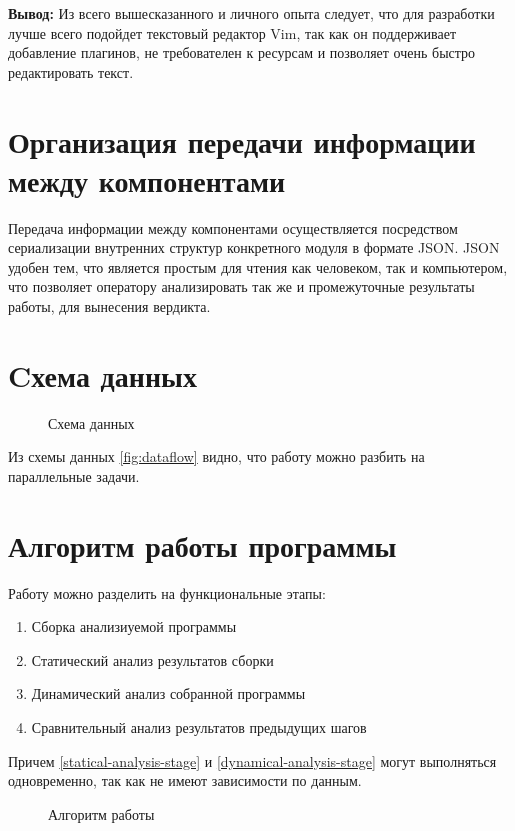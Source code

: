 \textbf{Вывод:} Из всего вышесказанного и личного опыта следует, 
что для разработки {\ProgModule} лучше всего подойдет текстовый редактор Vim,
так как он поддерживает добавление плагинов, не требователен к ресурсам и позволяет
очень быстро редактировать текст.

\newpage

\section{Организация передачи информации между компонентами {\ProgModule}}\label{sec:ch2/sec3}
Передача информации между компонентами {\ProgModule} осуществляется посредством
сериализации внутренних структур конкретного модуля в формате JSON.
JSON удобен тем, что является простым для чтения как человеком, так и компьютером,
что позволяет оператору анализировать так же и промежуточные результаты работы, для
вынесения вердикта.

\section{Cхема данных}\label{sec:ch2/sec4}

\begin{figure}[!htbp]
    \centerfloat{
        
    }
    \caption{Схема данных {\ProgModule}\label{fig:dataflow}}
\end{figure}
Из схемы данных \autoref{fig:dataflow} видно, что работу {\ProgModule} можно разбить на параллельные 
задачи.


\section{Алгоритм работы программы}\label{sec:ch2/sec5}
Работу {\ProgModule} можно разделить на функциональные этапы:
\begin{enumerate}
    \item Сборка анализиуемой программы 
    \item Статический анализ результатов сборки\label{statical-analysis-stage}
    \item Динамический анализ собранной программы\label{dynamical-analysis-stage}
    \item Сравнительный анализ результатов предыдущих шагов
\end{enumerate}

Причем \autoref{statical-analysis-stage} и \autoref{dynamical-analysis-stage} могут выполняться
одновременно, так как не имеют зависимости по данным.

\begin{figure}[!htbp]
    \centerfloat{
        
    }
    \caption{Алгоритм работы {\ProgModule}\label{fig:algorithm}}
\end{figure}

